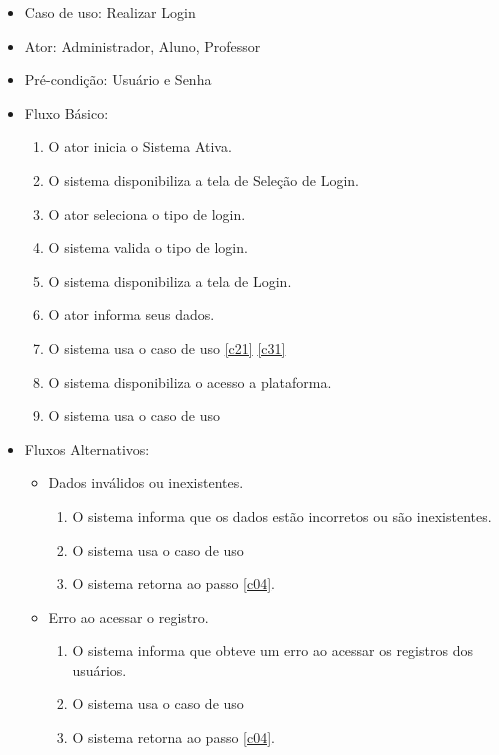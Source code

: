 \documentclass{utfpr-pg}
\begin{document}
    \begin{itemize}
        \item Caso de uso: Realizar Login
        \item Ator: Administrador, Aluno, Professor
        \item Pré-condição: Usuário e Senha
        \item Fluxo Básico:
        \begin{enumerate}[label=\textbf{\arabic*}]
            \item O ator inicia o Sistema Ativa.
            \item \label{c02}O sistema disponibiliza a tela de Seleção de Login.
            \item O ator seleciona o tipo de login.
            \item O sistema valida o tipo de login.
            \item \label{c04}O sistema disponibiliza a tela de Login.
            \item O ator informa seus dados.
            \item O sistema usa o caso de uso \textbf{\textit{}} \ref{c21} \ref{c31} 
            \item O sistema disponibiliza o acesso a plataforma.
            \item O sistema usa o caso de uso \textbf{\textit{}}
        \end{enumerate}
        
        \item Fluxos Alternativos:
        \begin{itemize}
            \item Dados inválidos ou inexistentes.
            \begin{enumerate}[label=\textbf{7.1.\arabic*}]
                \item \label{c21} O sistema informa que os dados estão incorretos ou  são inexistentes.
                \item O sistema usa o caso de uso \textbf{\textit{}}
                \item O sistema retorna ao passo \ref{c04}.
            \end{enumerate}
            
            \item Erro ao acessar o registro.
            \begin{enumerate}[label=\textbf{7.2.\arabic*}]
                \item \label{c31} O sistema informa que obteve um erro ao acessar os registros dos usuários.
                \item O sistema usa o caso de uso \textbf{\textit{}}
                \item O sistema retorna ao passo \ref{c04}.
            \end{enumerate}
        \end{itemize}
        
    \end{itemize}
    
\end{document}
